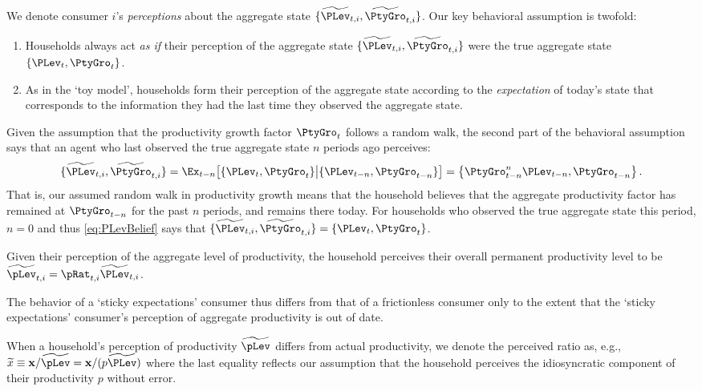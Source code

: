 We denote consumer $i$'s \textit{perceptions} about the aggregate state $\{\perc{\PLev}_{t,i},\perc{\PtyGro}_{t,i}\}$.  Our key behavioral assumption is twofold:
\begin{enumerate}
\item Households always act \textit{as if} their perception of the aggregate state $\{\perc{\PLev}_{t,i},\perc{\PtyGro}_{t,i}\}$ were the true aggregate state $\{\PLev_t,\PtyGro_t\}$.

\item As in the `toy model', households form their perception of the aggregate state according to the \textit{expectation} of today's state that corresponds to the information they had the last time they observed the aggregate state.
\end{enumerate}
Given the assumption that the productivity growth factor $\PtyGro_t$ follows a random walk,
the second part of the behavioral assumption says that an agent who last observed the true
aggregate state $n$ periods ago perceives:
\begin{equation}\label{eq:PLevBelief}
  \{\perc{\PLev}_{t,i},\perc{\PtyGro}_{t,i}\} = \Ex_{t-n}\big[\{\PLev_t,\PtyGro_t\} \big| \{\PLev_{t-n},\PtyGro_{t-n}\}\big] = \left\{\PtyGro_{t-n}^{n} \PLev_{t-n},\PtyGro_{t-n}\right\}.
\end{equation}
That is, our assumed random walk in productivity growth means that the household believes that the aggregate productivity factor has remained at $\PtyGro_{t-n}$ for the past $n$ periods, and remains there today. %
For households who observed the true aggregate state this period, $n=0$ and thus \eqref{eq:PLevBelief} says that $\{\perc{\PLev}_{t,i},\perc{\PtyGro}_{t,i}\} = \{\PLev_t,\PtyGro_t\}$.

Given their perception of the aggregate level of productivity, the household perceives their overall permanent productivity level to be $\perc{\pLev}_{t,i} = \pRat_{t,i} \perc{\PLev}_{t,i}$.

The behavior of a `sticky expectations' consumer thus differs from that of a frictionless consumer only to the extent that the `sticky expectations' consumer's perception of aggregate productivity is out of date.

When a household's perception of productivity $\perc{\pLev}$ differs from actual productivity, we denote the perceived ratio as, e.g., $\perc{x} \equiv \mathbf{x}/\perc{\pLev} = \mathbf{x}/({p}\perc{\PLev})$ where the last equality reflects our assumption that the household perceives the idiosyncratic component of their productivity ${p}$ without error.


